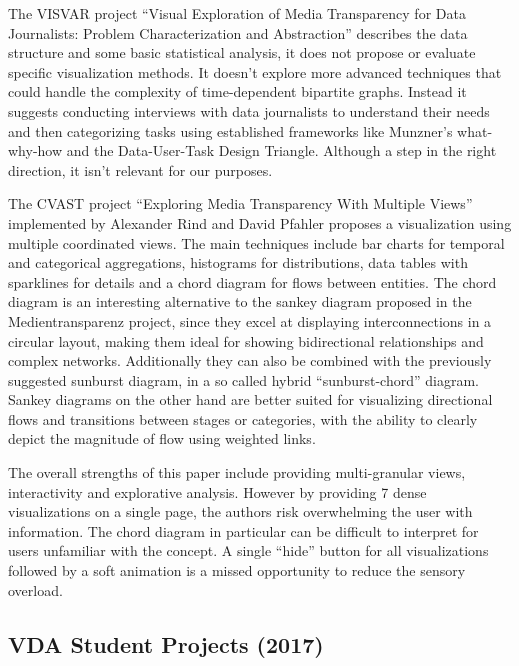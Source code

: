 \documentclass{vgtc}
\begin{document}
\medskip

The VISVAR project ``Visual Exploration of Media Transparency for Data Journalists: Problem Characterization and Abstraction'' \cite{aigner2016visual} describes the data structure and some basic statistical analysis, it does not propose or evaluate specific visualization methods. It doesn't explore more advanced techniques that could handle the complexity of time-dependent bipartite graphs. Instead it suggests conducting interviews with data journalists to understand their needs and then categorizing tasks using established frameworks like Munzner's what-why-how and the Data-User-Task Design Triangle. Although a step in the right direction, it isn't relevant for our purposes.

\medskip

The CVAST project ``Exploring Media Transparency With Multiple Views'' \cite{rind2016exploring} implemented by Alexander Rind and David Pfahler \cite{gitmtdb2} proposes a visualization using multiple coordinated views. The main techniques include bar charts for temporal and categorical aggregations, histograms for distributions, data tables with sparklines for details and a chord diagram for flows between entities. The chord diagram is an interesting alternative to the sankey diagram proposed in the Medientransparenz project, since they excel at displaying interconnections in a circular layout, making them ideal for showing bidirectional relationships and complex networks. Additionally they can also be combined with the previously suggested sunburst diagram, in a so called hybrid ``sunburst-chord'' diagram. Sankey diagrams on the other hand are better suited for visualizing directional flows and transitions between stages or categories, with the ability to clearly depict the magnitude of flow using weighted links.

The overall strengths of this paper include providing multi-granular views, interactivity and explorative analysis. However by providing 7 dense visualizations on a single page, the authors risk overwhelming the user with information. The chord diagram in particular can be difficult to interpret for users unfamiliar with the concept. A single ``hide'' button for all visualizations followed by a soft animation is a missed opportunity to reduce the sensory overload.

\subsection{VDA Student Projects (2017)}
\end{document}
